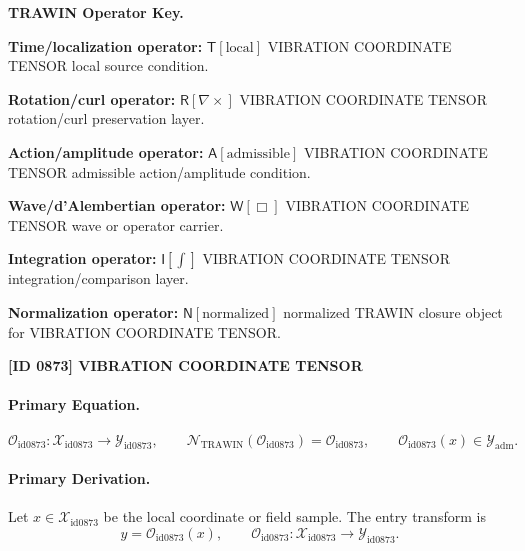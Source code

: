 \par\vspace{0.45\baselineskip}
\noindent\begin{minipage}[t]{\linewidth}
\begingroup
\small
\raggedright
\textbf{TRAWIN Operator Key.}\par
\noindent\textbf{Time/localization operator:} $\mathsf{T}\!\left[\mathrm{local}\right]$ VIBRATION COORDINATE TENSOR local source condition.\par
\noindent\textbf{Rotation/curl operator:} $\mathsf{R}\!\left[\nabla\times\right]$ VIBRATION COORDINATE TENSOR rotation/curl preservation layer.\par
\noindent\textbf{Action/amplitude operator:} $\mathsf{A}\!\left[\mathrm{admissible}\right]$ VIBRATION COORDINATE TENSOR admissible action/amplitude condition.\par
\noindent\textbf{Wave/d'Alembertian operator:} $\mathsf{W}\!\left[\Box\right]$ VIBRATION COORDINATE TENSOR wave or operator carrier.\par
\noindent\textbf{Integration operator:} $\mathsf{I}\!\left[\int\right]$ VIBRATION COORDINATE TENSOR integration/comparison layer.\par
\noindent\textbf{Normalization operator:} $\mathsf{N}\!\left[\mathrm{normalized}\right]$ normalized TRAWIN closure object for VIBRATION COORDINATE TENSOR.\par
\endgroup
\end{minipage}

\clearpage
\noindent\textbf{[ID 0873] VIBRATION COORDINATE TENSOR}\par
\vspace{0.35em}
\paragraph{Primary Equation.}
\[
\mathcal{O}_{\mathrm{id0873}}:\mathcal{X}_{\mathrm{id0873}}\longrightarrow \mathcal{Y}_{\mathrm{id0873}},\qquad
\mathcal{N}_{\mathrm{TRAWIN}}(\mathcal{O}_{\mathrm{id0873}})=\mathcal{O}_{\mathrm{id0873}},\qquad
\mathcal{O}_{\mathrm{id0873}}(x)\in\mathcal{Y}_{\mathrm{adm}}.
\]

\paragraph{Primary Derivation.} Let $x\in \mathcal{X}_{\mathrm{id0873}}$ be the local coordinate or field sample.  The entry transform is\[
y=\mathcal{O}_{\mathrm{id0873}}(x),\qquad \mathcal{O}_{\mathrm{id0873}}:\mathcal{X}_{\mathrm{id0873}}\longrightarrow \mathcal{Y}_{\mathrm{id0873}}.
\]

